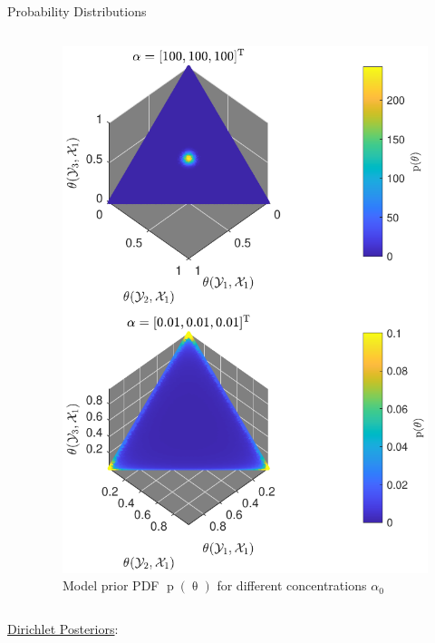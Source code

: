 \documentclass[final]{beamer}
\DeclareMathOperator{\prm}{\mathrm{p}}
\begin{document}
\begin{frame}{}
\begin{columns}[t]
\begin{column}{.32\linewidth}
\begin{block}{Probability Distributions}
\begin{columns}[t]
\begin{column}{.48\linewidth}
\end{column}
\begin{column}{.48\linewidth}

\begin{figure}
\centering
\includegraphics[width=0.9\linewidth]{P_theta.pdf}
\caption{Model prior PDF $\prm(\uptheta)$ for different concentrations $\alpha_0$}
\label{fig:P_theta}
\end{figure}

\end{column}
\end{columns}



\vspace{1cm}



\begin{columns}[t]
\begin{column}{.48\linewidth}

\underline{Dirichlet Posteriors}:


\end{column}
\end{columns}
\end{block}
\end{column}
\end{columns}
\end{frame}
\end{document}
